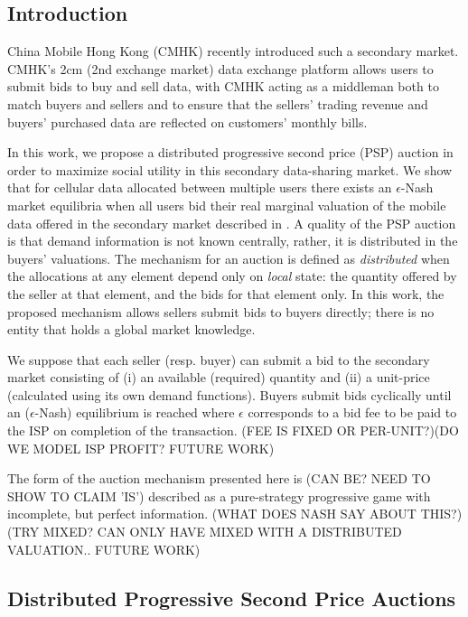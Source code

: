 \documentclass[12pt]{article}
\theoremstyle{definition}
\begin{document}
\begin{multicols}{2}

\section{Introduction}
China Mobile Hong Kong (CMHK) recently introduced such a secondary market.
CMHK’s 2cm (2nd exchange market) data exchange platform allows users to submit
bids to buy and sell data, with CMHK acting as a middleman both to match buyers
and sellers and to ensure that the sellers’ trading revenue and buyers’
purchased data are reflected on customers’ monthly bills. \cite{zheng}

In this work, we propose a distributed progressive second price (PSP) auction in
order to maximize social utility in this secondary data-sharing market. We show that for cellular data allocated between multiple users there
exists an $\epsilon$-Nash market equilibria when all users bid their real marginal
valuation of the mobile data offered in the secondary market described in
\cite{zheng}. A quality of the PSP auction is that
demand information is not known centrally, rather, it is distributed in the
buyers' valuations. The mechanism for an auction is defined
as \emph{distributed} when the allocations at any element depend only on
\emph{local} state: the quantity offered by the seller at that element, and the
bids for that element only. In this work, the proposed mechanism allows sellers submit bids to buyers
directly; there is no entity that holds a global market knowledge.

We suppose that each seller (resp. buyer) can submit a bid to the secondary
market consisting of (i) an available (required) quantity and (ii) a unit-price (calculated
using its own demand functions). Buyers submit bids cyclically until an
($\epsilon$-Nash) equilibrium is reached where $\epsilon$ corresponds to a bid
fee to be paid to the ISP on completion of the transaction. (FEE IS FIXED OR
PER-UNIT?)(DO WE MODEL ISP PROFIT? FUTURE WORK)

The form of the auction mechanism presented here is (CAN BE? NEED TO SHOW TO
CLAIM 'IS') described as a
pure-strategy progressive game with incomplete, but perfect information. (WHAT
DOES NASH SAY ABOUT THIS?) (TRY MIXED? CAN ONLY HAVE MIXED WITH A DISTRIBUTED
VALUATION.. FUTURE WORK) 

\subsection{Distributed Progressive Second Price Auctions}


\end{multicols}
\end{document}
